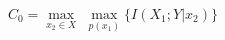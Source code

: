 \documentclass[preview]{standalone}
\begin{document}
\begin{center}
$C_0 = \underset{x_2 \in {X}}{\max}$ $\underset{p(x_1)}{\max} \{I(X_1;Y|x_2)\}$
\end{center}
\end{document}
